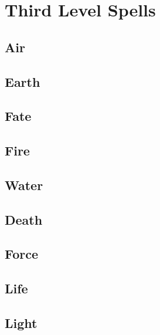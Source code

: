 \section{Third Level Spells}

\begin{multicols}{2}

\subsection{Air}


\subsection{Earth}


\subsection{Fate}


\subsection{Fire}

\subsection{Water}


\subsection{Death}


\subsection{Force}


\subsection{Life}


\subsection{Light}


\end{multicols}
